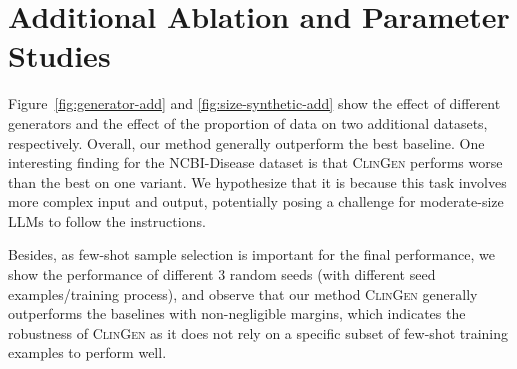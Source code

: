 \documentclass{article} %
\newcommand{\ours}{\textsc{ClinGen}\xspace}
\begin{document}
\clearpage
\section{Additional Ablation and Parameter Studies}
\label{sec:add_ablation_para}

Figure~\ref{fig:generator-add} and \ref{fig:size-synthetic-add} show the effect of different generators and the effect of the proportion of data on two additional datasets, respectively. Overall, our method generally outperform the best baseline. One interesting finding for the NCBI-Disease dataset is that {\ours} performs worse than the best on one variant. We hypothesize that it is because this task involves more complex input and output, potentially posing a challenge for moderate-size LLMs to follow the instructions. 


Besides, as few-shot sample selection is important for the final performance, we show the performance of different 3 random seeds (with different seed examples/training process), and observe that our method {\ours} generally outperforms the baselines with non-negligible margins, which indicates the robustness of {\ours} as it does not rely on a specific subset of few-shot training examples to perform well. 

\begin{figure}[t!]
    \centering
    \begin{minipage}{0.48\textwidth}
        \centering
         \hspace{-3mm}
        \vspace{-2ex}
    \end{minipage}%
    \begin{minipage}{0.48\textwidth}
        \centering
         \hspace{-6mm}
        \vspace{-2ex}
    \end{minipage}%
    \vspace{-0.5ex}
\end{figure}
\end{document}
